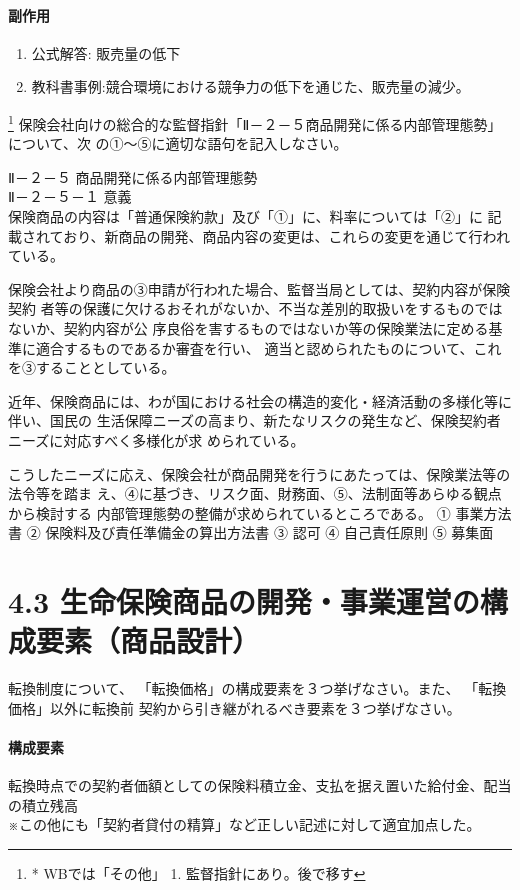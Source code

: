 \documentclass[report,gutter=10mm,fore-edge=10mm,uplatex,dvipdfmx]{jlreq}
\begin{document}
\paragraph{副作用}
\begin{enumerate}
 \item 公式解答: 販売量の低下
 \item 教科書事例:競合環境における競争力の低下を通じた、販売量の減少。
\end{enumerate}

\footnote{* WBでは「その他」 1. 監督指針にあり。後で移す}
保険会社向けの総合的な監督指針「Ⅱ－２－５商品開発に係る内部管理態勢」について、次
の①～⑤に適切な語句を記入しなさい。

Ⅱ－２－５ 商品開発に係る内部管理態勢\\
Ⅱ－２－５－１ 意義\\
保険商品の内容は「普通保険約款」及び「①」に、料率については「②」に
記載されており、新商品の開発、商品内容の変更は、これらの変更を通じて行われている。

保険会社より商品の③申請が行われた場合、監督当局としては、契約内容が保険契約
者等の保護に欠けるおそれがないか、不当な差別的取扱いをするものではないか、契約内容が公
序良俗を害するものではないか等の保険業法に定める基準に適合するものであるか審査を行い、
適当と認められたものについて、これを③することとしている。

近年、保険商品には、わが国における社会の構造的変化・経済活動の多様化等に伴い、国民の
生活保障ニーズの高まり、新たなリスクの発生など、保険契約者ニーズに対応すべく多様化が求
められている。

こうしたニーズに応え、保険会社が商品開発を行うにあたっては、保険業法等の法令等を踏ま
え、④に基づき、リスク面、財務面、⑤、法制面等あらゆる観点から検討する
内部管理態勢の整備が求められているところである。
① 事業方法書
② 保険料及び責任準備金の算出方法書
③ 認可
④ 自己責任原則
⑤ 募集面

\section{4.3 生命保険商品の開発・事業運営の構成要素（商品設計）}

転換制度について、
「転換価格」の構成要素を３つ挙げなさい。また、
「転換価格」以外に転換前
契約から引き継がれるべき要素を３つ挙げなさい。

\paragraph{構成要素}
転換時点での契約者価額としての保険料積立金、支払を据え置いた給付金、配当の積立残高\\
※この他にも「契約者貸付の精算」など正しい記述に対して適宜加点した。
\end{document}
